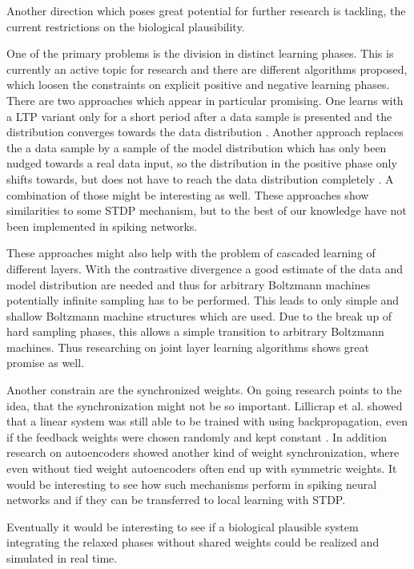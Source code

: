 Another direction which poses great potential for further research is tackling, the current restrictions on the biological plausibility.  

One of the primary problems is the division in distinct learning phases.
This is currently an active topic for research and there are different algorithms proposed, which loosen the constraints on explicit positive and negative learning phases.
There are two approaches which appear in particular promising.
One learns with a LTP variant only for a short period after a data sample is presented and the distribution converges towards the data distribution \cite{DBLP:journals/corr/ScellierB16}.
Another approach replaces the a data sample by a sample of the model distribution which has only been nudged towards a real data input, so the distribution in the positive phase only shifts towards, but does not have to reach the data distribution completely \cite{Scellier2016a}.
A combination of those might be interesting as well.
These approaches show similarities to some STDP mechanism, but to the best of our knowledge have not been implemented in spiking networks.

These approaches might also help with the problem of cascaded learning of different layers.
With the contrastive divergence a good estimate of the data and model distribution are needed and thus for arbitrary Boltzmann machines potentially infinite sampling has to be performed.
This leads to only simple and shallow Boltzmann machine structures which are used.
Due to the break up of hard sampling phases, this allows a simple transition to arbitrary Boltzmann machines.
Thus researching on joint layer learning algorithms shows great promise as well.

Another constrain are the synchronized weights.
On going research points to the idea, that the synchronization might not be so important.
Lillicrap et al. showed that a linear system was still able to be trained with using backpropagation, even if the feedback weights were chosen randomly and kept constant \cite{Lillicrap2014}.
In addition research on autoencoders showed another kind of weight synchronization, where even without tied weight autoencoders often end up with symmetric weights\cite{vincent2010stacked}.
It would be interesting to see how such mechanisms perform in spiking neural networks and if they can be transferred to local learning with STDP.

Eventually it would be interesting to see if a biological plausible system integrating the relaxed phases without shared weights could be realized and simulated in real time.
 